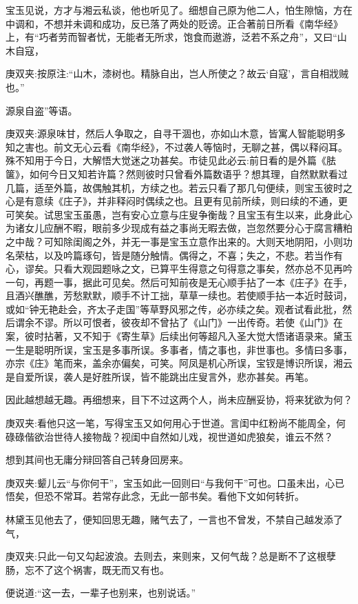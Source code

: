 \begin{parag}
    宝玉见说，方才与湘云私谈，他也听见了。细想自己原为他二人，怕生隙恼，方在中调和，不想并未调和成功，反已落了两处的贬谤。正合著前日所看《南华经》上，有“巧者劳而智者忧，无能者无所求，饱食而遨游，泛若不系之舟”，又曰“山木自寇，\begin{note}庚双夹:按原注:“山木，漆树也。精脉自出，岂人所使之？故云‘自寇’，言自相戕贼也。”\end{note}源泉自盗”等语。\begin{note}庚双夹:源泉味甘，然后人争取之，自寻干涸也，亦如山木意，皆寓人智能聪明多知之害也。前文无心云看《南华经》，不过袭人等恼时，无聊之甚，偶以释闷耳。殊不知用于今日，大解悟大觉迷之功甚矣。市徒见此必云:前日看的是外篇《胠箧》，如何今日又知若许篇？然则彼时只曾看外篇数语乎？想其理，自然默默看过几篇，适至外篇，故偶触其机，方续之也。若云只看了那几句便续，则宝玉彼时之心是有意续《庄子》，并非释闷时偶续之也。且更有见前所续，则曰续的不通，更可笑矣。试思宝玉虽愚，岂有安心立意与庄叟争衡哉？且宝玉有生以来，此身此心为诸女儿应酬不暇，眼前多少现成有益之事尚无暇去做，岂忽然要分心于腐言糟粕之中哉？可知除闺阁之外，并无一事是宝玉立意作出来的。大则天地阴阳，小则功名荣枯，以及吟篇琢句，皆是随分触情。偶得之，不喜；失之，不悲。若当作有心，谬矣。只看大观园题咏之文，已算平生得意之句得意之事矣，然亦总不见再吟一句，再题一事，据此可见矣。然后可知前夜是无心顺手拈了一本《庄子》在手，且酒兴醮醮，芳愁默默，顺手不计工拙，草草一续也。若使顺手拈一本近时鼓词，或如“钟无艳赴会，齐太子走国”等草野风邪之传，必亦续之矣。观者试看此批，然后谓余不谬。所以可恨者，彼夜却不曾拈了《山门》一出传奇。若使《山门》在案，彼时拈著，又不知于《寄生草》后续出何等超凡入圣大觉大悟诸语录来。黛玉一生是聪明所误，宝玉是多事所误。多事者，情之事也，非世事也。多情曰多事，亦宗《庄》笔而来，盖余亦偏矣，可笑。阿凤是机心所误，宝钗是博识所误，湘云是自爱所误，袭人是好胜所误，皆不能跳出庄叟言外，悲亦甚矣。再笔。\end{note}因此越想越无趣。再细想来，目下不过这两个人，尚未应酬妥协，将来犹欲为何？\begin{note}庚双夹:看他只这一笔，写得宝玉又如何用心于世道。言闺中红粉尚不能周全，何碌碌偕欲治世待人接物哉？视闺中自然如儿戏，视世道如虎狼矣，谁云不然？\end{note}想到其间也无庸分辩回答自己转身回房来。\begin{note}庚双夹:颦儿云“与你何干”，宝玉如此一回则曰“与我何干”可也。口虽未出，心已悟矣，但恐不常耳。若常存此念，无此一部书矣。看他下文如何转折。\end{note}林黛玉见他去了，便知回思无趣，赌气去了，一言也不曾发，不禁自己越发添了气，\begin{note}庚双夹:只此一句又勾起波浪。去则去，来则来，又何气哉？总是断不了这根孽肠，忘不了这个祸害，既无而又有也。\end{note}便说道:“这一去，一辈子也别来，也别说话。”
\end{parag}



